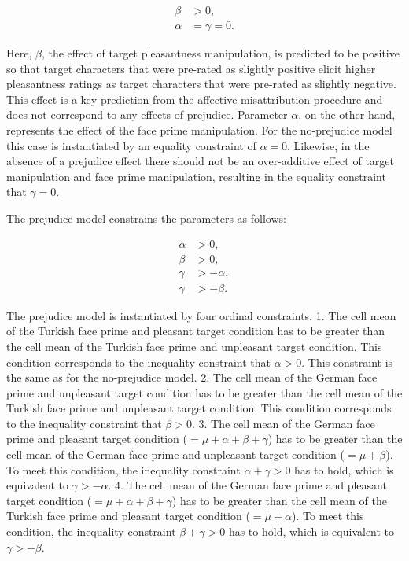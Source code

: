 \documentclass[english,,man]{apa6}
\begin{document}
\[
\begin{aligned}
\beta &>  0,\\
\alpha &= \gamma = 0.
\end{aligned}
\]

Here, \(\beta\), the effect of target pleasantness manipulation, is predicted to be positive so that target characters that were pre-rated as slightly positive elicit higher pleasantness ratings as target characters that were pre-rated as slightly negative. This effect is a key prediction from the affective misattribution procedure and does not correspond to any effects of prejudice. Parameter \(\alpha\), on the other hand, represents the effect of the face prime manipulation. For the no-prejudice model this case is instantiated by an equality constraint of \(\alpha = 0\). Likewise, in the absence of a prejudice effect there should not be an over-additive effect of target manipulation and face prime manipulation, resulting in the equality constraint that \(\gamma = 0\).

The prejudice model constrains the parameters as follows:

\[
\begin{aligned}
\alpha &>  0, \\ 
\beta &>  0, \\
\gamma &> -\alpha,\\
\gamma &> -\beta.
\end{aligned}
\]

The prejudice model is instantiated by four ordinal constraints. 1. The cell mean of the Turkish face prime and pleasant target condition has to be greater than the cell mean of the Turkish face prime and unpleasant target condition. This condition corresponds to the inequality constraint that \(\alpha > 0\). This constraint is the same as for the no-prejudice model. 2. The cell mean of the German face prime and unpleasant target condition has to be greater than the cell mean of the Turkish face prime and unpleasant target condition. This condition corresponds to the inequality constraint that \(\beta > 0\). 3. The cell mean of the German face prime and pleasant target condition (\(= \mu + \alpha + \beta + \gamma\)) has to be greater than the cell mean of the German face prime and unpleasant target condition (\(= \mu + \beta\)). To meet this condition, the inequality constraint \(\alpha + \gamma > 0\) has to hold, which is equivalent to \(\gamma > -\alpha\). 4. The cell mean of the German face prime and pleasant target condition (\(= \mu + \alpha + \beta + \gamma\)) has to be greater than the cell mean of the Turkish face prime and pleasant target condition (\(= \mu + \alpha\)). To meet this condition, the inequality constraint \(\beta + \gamma > 0\) has to hold, which is equivalent to \(\gamma > -\beta\).
\end{document}
